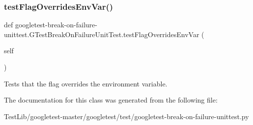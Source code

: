 \subsubsection{\texorpdfstring{test\+Flag\+Overrides\+Env\+Var()}{testFlagOverridesEnvVar()}}
{\footnotesize\ttfamily def googletest-\/break-\/on-\/failure-\/unittest.\+G\+Test\+Break\+On\+Failure\+Unit\+Test.\+test\+Flag\+Overrides\+Env\+Var (\begin{DoxyParamCaption}\item[{}]{self }\end{DoxyParamCaption})}

\begin{DoxyVerb}Tests that the flag overrides the environment variable.\end{DoxyVerb}
 

The documentation for this class was generated from the following file\+:\begin{DoxyCompactItemize}
\item 
Test\+Lib/googletest-\/master/googletest/test/googletest-\/break-\/on-\/failure-\/unittest.\+py\end{DoxyCompactItemize}
